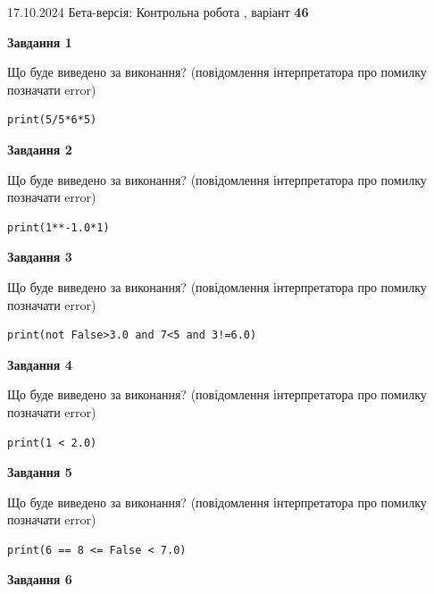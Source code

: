 \documentclass[12pt, ukrainian]{article}
\begin{document}
{\Large{17.10.2024 Бета-версія: Контрольна робота , варіант  \No \textbf { 46 }\par}}
{
\begin {large}
{\begin {center}\textbf{Завдання 1}\end {center}}

Що буде виведено за виконання? (повідомлення інтерпретатора про помилку позначати error)\par
\begin{verbatim}
print(5/5*6*5)
\end{verbatim}

{\begin {center}\textbf{Завдання 2}\end {center}}

Що буде виведено за виконання? (повідомлення інтерпретатора про помилку позначати error)\par
\begin{verbatim}
print(1**-1.0*1)
\end{verbatim}

{\begin {center}\textbf{Завдання 3}\end {center}}

Що буде виведено за виконання? (повідомлення інтерпретатора про помилку позначати error)\par
\begin{verbatim}
print(not False>3.0 and 7<5 and 3!=6.0)
\end{verbatim}

{\begin {center}\textbf{Завдання 4}\end {center}}

Що буде виведено за виконання? (повідомлення інтерпретатора про помилку позначати error)\par
\begin{verbatim}
print(1 < 2.0)
\end{verbatim}

{\begin {center}\textbf{Завдання 5}\end {center}}

Що буде виведено за виконання? (повідомлення інтерпретатора про помилку позначати error)\par
\begin{verbatim}
print(6 == 8 <= False < 7.0)
\end{verbatim}

{\begin {center}\textbf{Завдання 6}\end {center}}


\end{large}}
\end{document}

